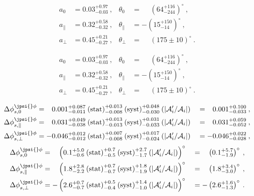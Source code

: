 \begin{align}
a_0 & = 0.03^{+0.97}_{-0.03}\:, & \theta_0 & = \phantom{-}\left(64^{+116}_{-244}\right)^{\circ}\:,\\
%
a_\parallel & = 0.32^{+0.58}_{-0.32}\:, & \theta_\parallel & = -\left(15^{+150}_{-14}\right)^{\circ}\:,\\
%
a_\perp & = 0.45^{+0.21}_{-0.27}\:, & \theta_\perp & = \phantom{-}\left(175 \pm 10\right)^{\circ}\:.
\end{align}

\begin{align}
a_0 & = 0.03^{+0.97}_{-0.03}\:, & \theta_0 & = \phantom{-}\left(64^{+116}_{-244}\right)^{\circ}\:,\\
%
a_\parallel & = 0.32^{+0.58}_{-0.32}\:, & \theta_\parallel & = -\left(15^{+150}_{-14}\right)^{\circ}\:,\\
%
a_\perp & = 0.45^{+0.21}_{-0.27}\:, & \theta_\perp & = \phantom{-}\left(175 \pm 10\right)^{\circ}\:.
\end{align}


\begin{alignat}{2}
\Delta\phi^{\jpsi{}\phi}_{s,0} & =
\phantom{-}0.001^{+0.087}_{-0.011}\:\text{(stat)}^{+0.013}_{-0.008}\:\text{(syst)}^{+0.048}_{-0.030}\:(|\mathcal{A}'_i/\mathcal{A}_i|)
&& = \phantom{-}0.001^{+0.100}_{-0.033}\:,\\
%
\Delta\phi^{\jpsi{}\phi}_{s,\parallel} & =
\phantom{-}0.031^{+0.049}_{-0.038}\:\text{(stat)}^{+0.013}_{-0.013}\:\text{(syst)}^{+0.031}_{-0.033}\:(|\mathcal{A}'_i/\mathcal{A}_i|)
&& = \phantom{-}0.031^{+0.059}_{-0.052}\:,\\
%
\Delta\phi^{\jpsi{}\phi}_{s,\perp} & =
-0.046^{+0.012}_{-0.012}\:\text{(stat)}^{+0.007}_{-0.008}\:\text{(syst)}^{+0.017}_{-0.024}\:(|\mathcal{A}'_i/\mathcal{A}_i|)
&& = -0.046^{+0.022}_{-0.028}\:,
\end{alignat}
\begin{alignat}{2}
\Delta\phi^{\jpsi{}\phi}_{s,0} & =
\phantom{-}\left(0.1^{+5.0}_{-0.6}\:\text{(stat)}^{+0.7}_{-0.5}\:\text{(syst)}^{+2.7}_{-1.7}\:(|\mathcal{A}'_i/\mathcal{A}_i|)\right)^{\circ}
&& = \phantom{-}\left(0.1^{+5.7}_{-1.9}\right)^{\circ}\:,\\
%
\Delta\phi^{\jpsi{}\phi}_{s,\parallel} & =
\phantom{-}\left(1.8^{+2.8}_{-2.2}\:\text{(stat)}^{+0.7}_{-0.7}\:\text{(syst)}^{+1.8}_{-1.9}\:(|\mathcal{A}'_i/\mathcal{A}_i|)\right)^{\circ}
&& = \phantom{-}\left(1.8^{+3.4}_{-3.0}\right)^{\circ}\:,\\
%
\Delta\phi^{\jpsi{}\phi}_{s,\perp} & =
-\left(2.6^{+0.7}_{-0.7}\:\text{(stat)}^{+0.5}_{-0.4}\:\text{(syst)}^{+1.4}_{-1.0}\:(|\mathcal{A}'_i/\mathcal{A}_i|)\right)^{\circ}
&& = -\left(2.6^{+1.6}_{-1.3}\right)^{\circ}\:.
\end{alignat}
